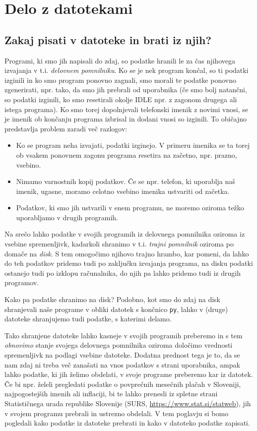 \chapter{Delo z datotekami}

\section{Zakaj pisati v datoteke in brati iz njih?}

Programi, ki smo jih napisali do zdaj, so podatke hranili le za čas njihovega izvajanja v t.i. \emph{delovnem pomnilniku}. Ko se je nek program končal, so ti podatki izginili in ko smo program ponovno zagnali, smo morali te podatke ponovno zgenerirati, npr. tako, da smo jih prebrali od uporabnika (če smo bolj natančni, so podatki izginili, ko smo resetirali okolje IDLE npr. z zagonom drugega ali istega programa). Ko smo torej dopolnjevali telefonski imenik z novimi vnosi, se je imenik ob končanju programa izbrisal in dodani vnosi so izginili. To običajno predstavlja problem zaradi več razlogov:
\begin{itemize}
    \item Ko se program neha izvajati, podatki izginejo. V primeru imenika se ta torej ob vsakem ponovnem zagonu programa resetira na začetno, npr. prazno, vsebino.
    \item Nimamo varnostnih kopij podatkov. Če se npr. telefon, ki uporablja naš imenik, ugasne, moramo celotno vsebino imenika ustvariti od začetka.
    \item Podatkov, ki smo jih ustvarili v enem programu, ne moremo oziroma težko uporabljamo v drugih programih. 
\end{itemize}
Na srečo lahko podatke v svojih programih iz delovnega pomnilnika oziroma iz vsebine spremenljivk, kadarkoli shranimo v t.i. \emph{trajni pomnilnik} oziroma po domače na \emph{disk}. S tem omogočimo njihovo trajno hrambo, kar pomeni, da lahko do teh podatkov pridemo tudi po zaključku izvajanja programa, na disku podatki ostanejo tudi po izklopu računalnika, do njih pa lahko pridemo tudi iz drugih programov. 

Kako pa podatke shranimo na disk? Podobno, kot smo do zdaj na disk shranjevali naše programe v obliki datotek s končnico \texttt{py}, lahko v (druge) datoteke shranjujemo tudi podatke, s katerimi delamo. 

Tako shranjene datoteke lahko kasneje v svojih programih preberemo in s tem \emph{obnovimo} stanje svojega delovnega pomnilnika oziroma določimo vrednosti spremenljivk na podlagi vsebine datoteke. Dodatna prednost tega je to, da se nam zdaj ni treba več zanašati na vnos podatkov s strani uporabnika, ampak lahko podatke, ki jih želimo obdelati, v svoje programe preberemo kar iz datotek. Če bi npr. želeli pregledati podatke o povprečnih mesečnih plačah v Sloveniji, najpogostejših imenih ali inflaciji, bi te lahko prenesli iz spletne strani Statističnega urada republike Slovenije (SURS, \url{https://www.stat.si/statweb}), jih v svojem programu prebrali in ustrezno obdelali. V tem poglavju si bomo pogledali kako podatke iz datoteke prebrati in kako v datoteko podatke zapisati.

